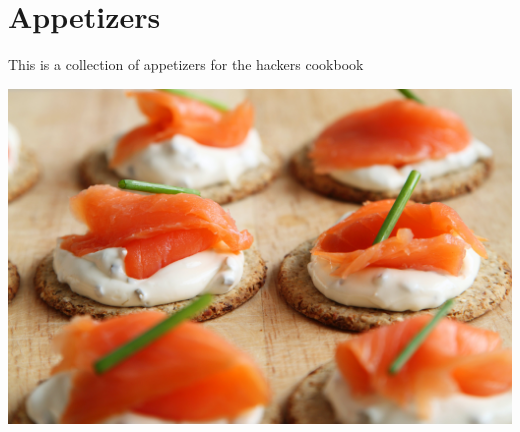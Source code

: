 \pagebreak
\chapter{Appetizers}

This is a collection of appetizers for the hackers cookbook

\centering
\includegraphics[scale=0.1]{images/appetizer-canape-canapes-cheese-41967.jpg}

